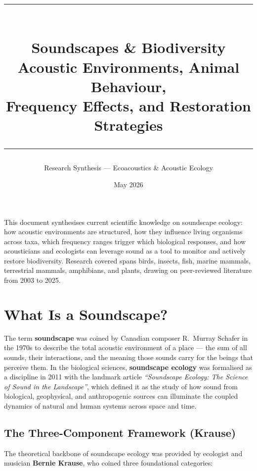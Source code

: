 \documentclass[12pt, a4paper]{article}
\title{%
  {\color{darkgreen}\rule{\linewidth}{2pt}}\\[6pt]
  {\Huge\bfseries\color{forestgreen} Soundscapes \& Biodiversity}\\[4pt]
  {\large\color{darkgreen} Acoustic Environments, Animal Behaviour,\\
  Frequency Effects, and Restoration Strategies}\\[6pt]
  {\color{darkgreen}\rule{\linewidth}{2pt}}
}
\author{Research Synthesis --- Ecoacoustics \& Acoustic Ecology}
\date{May 2026}
\begin{document}

\maketitle
\thispagestyle{empty}

\vspace{0.5cm}

\begin{greenbox}[title=Abstract]
This document synthesises current scientific knowledge on soundscape ecology: how acoustic
environments are structured, how they influence living organisms across taxa, which frequency
ranges trigger which biological responses, and how acousticians and ecologists can leverage
sound as a tool to monitor and actively restore biodiversity. Research covered spans birds,
insects, fish, marine mammals, terrestrial mammals, amphibians, and plants, drawing on
peer-reviewed literature from 2003 to 2025.
\end{greenbox}

\vspace{0.5cm}
\tableofcontents
\newpage

\section{What Is a Soundscape?}

The term \textbf{soundscape} was coined by Canadian composer R.~Murray Schafer in the 1970s to
describe the total acoustic environment of a place --- the sum of all sounds, their
interactions, and the meaning those sounds carry for the beings that perceive them. In the
biological sciences, \textbf{soundscape ecology} was formalised as a discipline in 2011 with the
landmark article \textit{``Soundscape Ecology: The Science of Sound in the Landscape''}, which
defined it as the study of how sound from biological, geophysical, and anthropogenic sources can
illuminate the coupled dynamics of natural and human systems across space and time.

\subsection{The Three-Component Framework (Krause)}

The theoretical backbone of soundscape ecology was provided by ecologist and musician
\textbf{Bernie Krause}, who coined three foundational categories:
\end{document}

